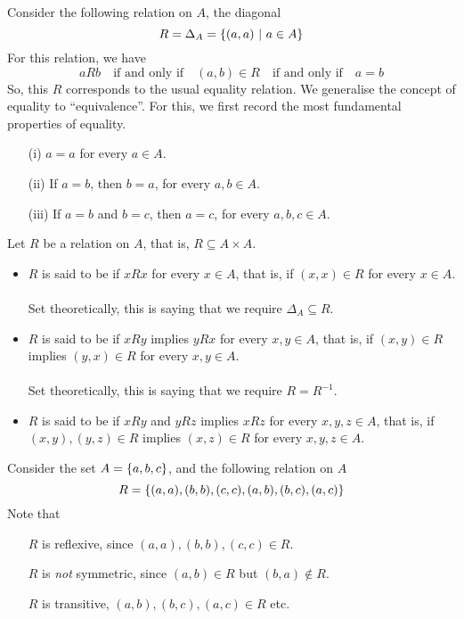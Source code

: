 \vspace*{1em}

\begin{example}[Equality]
Consider the following relation on $A$, the diagonal
\[R = \Delta_A = \left\{(a,a)\ \vert\ a \in A\right\}\]
For this relation, we have
\[aRb \quad \text{if and only if} \quad (a,b) \in R \quad \text{if and only if} \quad a = b\]
So, this $R$ corresponds to the usual equality relation. We generalise the concept of equality to ``equivalence''. For this, we first record the most fundamental properties of equality.
\begin{itemize}
\item[(i)] $a = a$ for every $a \in A$.
\item[(ii)] If $a = b$, then $b = a$, for every $a,b \in A$.
\item[(iii)] If $a = b$ and $b = c$, then $a = c$, for every $a,b,c \in A$.
\end{itemize}
\end{example} 

\vspace*{1em}

\begin{definition}
Let $R$ be a relation on $A$, that is, $R \subseteq A \times A$.
\begin{itemize}[itemsep=1em]
\item $R$ is said to be  if $xRx$ for every $x \in A$, that is, if $(x,x) \in R$ for every $x \in A$.\\
\\
Set theoretically, this is saying that we require $\Delta_A \subseteq R$.

\item $R$ is said to be  if $xRy$ implies $yRx$ for every $x,y \in A$, that is, if $(x,y) \in R$ implies $(y,x) \in R$ for every $x,y \in A$.\\
\\
Set theoretically, this is saying that we require $R = R^{-1}$.

\item $R$ is said to be  if $xRy$ and $yRz$ implies $xRz$ for every $x,y,z \in A$, that is, if $(x,y),(y,z) \in R$ implies $(x,z) \in R$ for every $x,y,z \in A$.
\end{itemize}
\end{definition}

\vspace*{1em}

\begin{example}
Consider the set $A = \left\{a,b,c\right\}$, and the following relation on $A$
\[R = \left\{(a,a),(b,b),(c,c),(a,b),(b,c),(a,c)\right\}\]
Note that
\begin{itemize}[leftmargin=*]
\item[] $R$ is reflexive, since $(a,a),(b,b),(c,c) \in R$.
\item[] $R$ is \emph{not} symmetric, since $(a,b) \in R$ but $(b,a) \notin R$.
\item[] $R$ is transitive, $(a,b),(b,c),(a,c) \in R$ etc.
\end{itemize}
\end{example}


